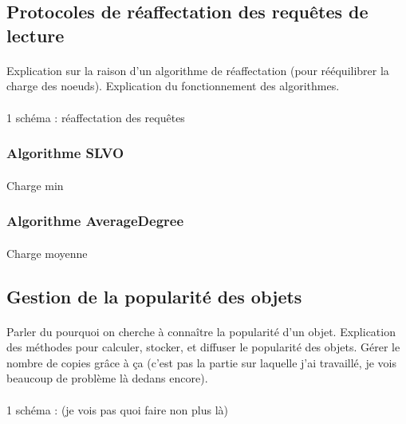 \documentclass[12pt]{article}
\begin{document}
\subsection{Protocoles de réaffectation des requêtes de lecture}
\paragraph{} Explication sur la raison d'un algorithme de réaffectation (pour rééquilibrer la charge des noeuds). Explication du fonctionnement des algorithmes.

\paragraph{} 1 schéma : réaffectation des requêtes

\subsubsection{Algorithme SLVO}
\paragraph{} Charge min
\subsubsection{Algorithme AverageDegree}
\paragraph{} Charge moyenne

\subsection{Gestion de la popularité des objets}
\paragraph{} Parler du pourquoi on cherche à connaître la popularité d'un objet. Explication des méthodes pour calculer, stocker, et diffuser le popularité des objets. Gérer le nombre de copies grâce à ça (c'est pas la partie sur laquelle j'ai travaillé, je vois beaucoup de problème là dedans encore).

\paragraph{} 1 schéma : (je vois pas quoi faire non plus là)
\end{document}
